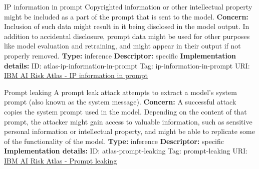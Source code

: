 \documentclass[a4paper,12pt]{article}
\begin{document}
\begin{definitionbox}{IP information in prompt}
Copyrighted information or other intellectual property might be included as a part of the prompt that is sent to the model.\newline\newline
\textbf{Concern: }Inclusion of such data might result in it being disclosed in the model output. In addition to accidental disclosure, prompt data might be used for other purposes like model evaluation and retraining, and might appear in their output if not properly removed.\newline\newline
\textbf{Type: }inference\newline
\textbf{Descriptor: }specific \newline\newline
\textbf{Implementation details: } \newline
ID: atlas-ip-information-in-prompt \newline
Tag: ip-information-in-prompt \newline
URI:  \href{https://www.ibm.com/docs/en/watsonx/saas?topic=SSYOK8/wsj/ai-risk-atlas/ip-information-in-prompt.html}{IBM AI Risk Atlas - IP information in prompt}\newline
\end{definitionbox}
\begin{definitionbox}{Prompt leaking}
A prompt leak attack attempts to extract a model's system prompt (also known as the system message).\newline\newline
\textbf{Concern: }A successful attack copies the system prompt used in the model. Depending on the content of that prompt, the attacker might gain access to valuable information, such as sensitive personal information or intellectual property, and might be able to replicate some of the functionality of the model.\newline\newline
\textbf{Type: }inference\newline
\textbf{Descriptor: }specific \newline\newline
\textbf{Implementation details: } \newline
ID: atlas-prompt-leaking \newline
Tag: prompt-leaking \newline
URI:  \href{https://www.ibm.com/docs/en/watsonx/saas?topic=SSYOK8/wsj/ai-risk-atlas/prompt-leaking.html}{IBM AI Risk Atlas - Prompt leaking}\newline
\end{definitionbox}
\end{document}
